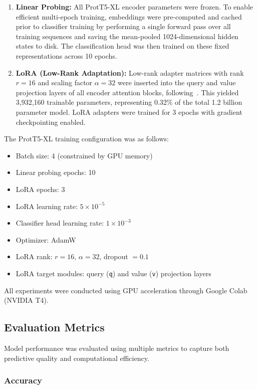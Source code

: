 \documentclass{article}
\begin{document}
\begin{enumerate}
    \item \textbf{Linear Probing:} All ProtT5-XL encoder parameters were frozen. To enable efficient multi-epoch training, embeddings were pre-computed and cached prior to classifier training by performing a single forward pass over all training sequences and saving the mean-pooled 1024-dimensional hidden states to disk. The classification head was then trained on these fixed representations across 10 epochs.
    \item \textbf{LoRA (Low-Rank Adaptation):} Low-rank adapter matrices with rank $r=16$ and scaling factor $\alpha=32$ were inserted into the query and value projection layers of all encoder attention blocks, following~\cite{hu2021lora}. This yielded 3,932,160 trainable parameters, representing 0.32\% of the total 1.2 billion parameter model. LoRA adapters were trained for 3 epochs with gradient checkpointing enabled.
\end{enumerate}

The ProtT5-XL training configuration was as follows:
\begin{itemize}
    \item Batch size: 4 (constrained by GPU memory)
    \item Linear probing epochs: 10
    \item LoRA epochs: 3
    \item LoRA learning rate: $5 \times 10^{-5}$
    \item Classifier head learning rate: $1 \times 10^{-3}$
    \item Optimizer: AdamW
    \item LoRA rank: $r = 16$, $\alpha = 32$, dropout $= 0.1$
    \item LoRA target modules: query (\texttt{q}) and value (\texttt{v}) projection layers
\end{itemize}

All experiments were conducted using GPU acceleration through Google Colab (NVIDIA T4).

\subsection{Evaluation Metrics}

Model performance was evaluated using multiple metrics to capture both predictive quality and computational efficiency.

\subsubsection{Accuracy}
\end{document}
